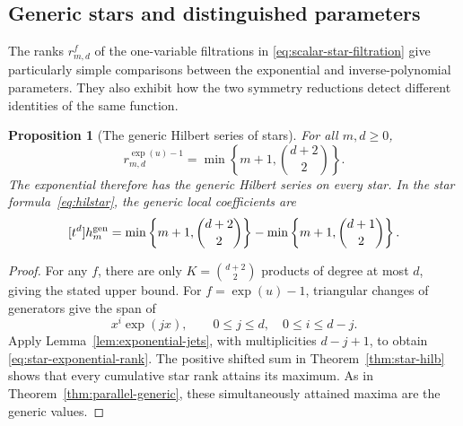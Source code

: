 \documentclass[reqno]{article}
\theoremstyle{plain} %
\newtheorem{proposition}[theorem]{Proposition}
\theoremstyle{definition}
\theoremstyle{remark}
\numberwithin{equation}{section}
\begin{document}
\subsection{Generic stars and distinguished parameters}
\label{sec:star-generic}

The ranks $r_{m,d}^f$ of the one-variable filtrations
in \eqref{eq:scalar-star-filtration} give
particularly simple comparisons between the exponential and
inverse-polynomial parameters. They also exhibit how the two symmetry
reductions detect different identities of the same function.

\begin{proposition}[The generic Hilbert series of stars]\label{prop:star-exponential}
For all $m,d\ge0$,
\begin{equation}\label{eq:star-exponential-rank}
 r_{m,d}^{\exp(u)-1}
 =\min\left\{m+1,\binom{d+2}{2}\right\}.
\end{equation}
The exponential therefore has the generic Hilbert series on every
star. In the star formula~\eqref{eq:hilstar}, the generic local
coefficients are
\[
 [t^d]h_m^{\rm gen}
 =\min\left\{m+1,\binom{d+2}{2}\right\}
  -\min\left\{m+1,\binom{d+1}{2}\right\}.
\]
\end{proposition}
\begin{proof}
For any $f$, there are only $K=\binom{d+2}{2}$ products of degree at
most $d$, giving the stated upper bound. For $f=\exp(u)-1$, triangular
changes of generators give the span of
\[
 x^i\exp(jx),\qquad 0\le j\le d,\quad 0\le i\le d-j.
\]
Apply Lemma~\ref{lem:exponential-jets}, with multiplicities $d-j+1$,
to obtain \eqref{eq:star-exponential-rank}. The positive shifted sum
in Theorem~\ref{thm:star-hilb} shows that every cumulative star rank
attains its maximum. As in Theorem~\ref{thm:parallel-generic}, these
simultaneously attained maxima are the generic values.
\end{proof}
\end{document}
